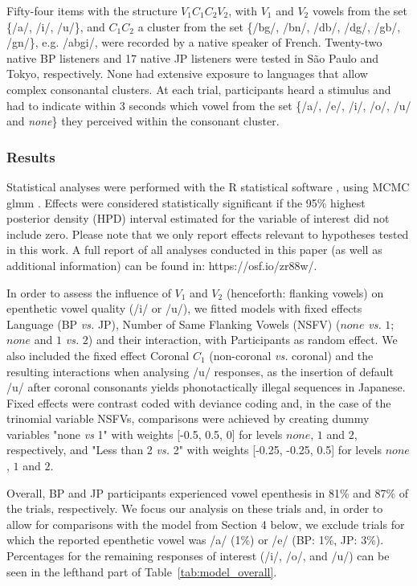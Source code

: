 Fifty-four items with the structure $V_{1}C_{1}C_{2}V_{2}$, with $V_{1}$ and $V_{2}$ vowels from the set \{/a/, /i/, /u/\}, and $C_{1}C_{2}$ a cluster from the set \{/bg/, /bn/, /db/, /dg/, /gb/, /gn/\}, e.g. /abgi/, were recorded by a native speaker of French. Twenty-two native BP listeners and 17 native JP listeners were tested in S\~{a}o Paulo and Tokyo, respectively. None had extensive exposure to languages that allow complex consonantal clusters. At each trial, participants heard a stimulus and had to indicate within 3 seconds which vowel from the set \{/a/, /e/, /i/, /o/, /u/ and \textit{none}\} they perceived within the consonant cluster. 

\subsubsection{Results}
Statistical analyses were performed with the R statistical software \cite{R-base}, using MCMC glmm \cite{R-MCMCglmm, R-coda}. Effects were considered statistically significant if the 95\% highest posterior density (HPD) interval estimated for the variable of interest did not include zero. Please note that we only report effects relevant to hypotheses tested in this work. A full report of all analyses conducted in this paper (as well as additional information) can be found in: https://osf.io/zr88w/.

In order to assess the influence of $V_{1}$ and $V_{2}$ (henceforth: flanking vowels) on epenthetic vowel quality (/i/ or /u/), we fitted models with fixed effects Language (BP \textit{vs.} JP), Number of Same Flanking Vowels (NSFV) ($none$ \textit{vs.} $1$; $none$ and $1$ \textit{vs.} $2$) and their interaction, with Participants as random effect. We also included the fixed effect Coronal $C_{1}$ (non-coronal \textit{vs.} coronal) and the resulting interactions when analysing /u/ responses, as the insertion of default /u/ after coronal consonants yields phonotactically illegal sequences in Japanese. Fixed effects were contrast coded with deviance coding and, in the case of the trinomial variable NSFVs, comparisons were achieved by creating dummy variables "none \textit{vs} 1" with weights [-0.5, 0.5, 0] for levels $none$, $1$ and $2$, respectively, and "Less than 2 \textit{vs.} 2" with weights [-0.25, -0.25, 0.5] for levels $none$, $1$ and $2$. 

Overall, BP and JP participants experienced vowel epenthesis in 81\% and 87\% of the trials, respectively. We focus our analysis on these trials and, in order to allow for comparisons with the model from Section 4 below, we exclude trials for which the reported epenthetic vowel was /a/ (1\%) or /e/ (BP: 1\%, JP: 3\%). Percentages for the remaining responses of interest (/i/, /o/, and /u/) can be seen in the lefthand part of Table~\ref{tab:model_overall}. 

